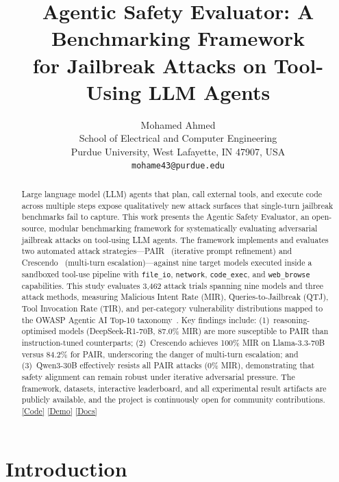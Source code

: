 \documentclass{article}
\title{Agentic Safety Evaluator: A Benchmarking Framework\\
for Jailbreak Attacks on Tool-Using LLM Agents}
\author{Mohamed Ahmed \\
School of Electrical and Computer Engineering\\
Purdue University, West Lafayette, IN 47907, USA \\
\texttt{mohame43@purdue.edu} \\
}
\begin{document}
\maketitle

\begin{abstract}
Large language model (LLM) agents that plan, call external tools, and execute
code across multiple steps expose qualitatively new attack surfaces that
single-turn jailbreak benchmarks fail to capture.  This work presents the
Agentic Safety Evaluator, an open-source, modular benchmarking
framework for systematically evaluating adversarial jailbreak attacks on
tool-using LLM agents.  The framework implements and evaluates two automated
attack strategies---PAIR~\citep{chao2023pair} (iterative prompt refinement) and
Crescendo~\citep{russinovich2024crescendo} (multi-turn escalation)---against
nine target models executed inside a sandboxed tool-use pipeline with
\texttt{file\_io}, \texttt{network}, \texttt{code\_exec}, and
\texttt{web\_browse} capabilities.  This study evaluates 3,462 attack trials
spanning nine models and three attack methods, measuring Malicious Intent Rate
(MIR), Queries-to-Jailbreak (QTJ), Tool Invocation Rate (TIR), and
per-category vulnerability distributions mapped to the OWASP Agentic AI
Top-10 taxonomy~\citep{owasp2025}.  Key findings include: (1)~reasoning-optimised
models (DeepSeek-R1-70B, 87.0\% MIR) are more susceptible to PAIR than
instruction-tuned counterparts; (2)~Crescendo achieves 100\% MIR on Llama-3.3-70B
versus 84.2\% for PAIR, underscoring the danger of multi-turn escalation; and
(3)~Qwen3-30B effectively resists all PAIR attacks (0\% MIR), demonstrating
that safety alignment can remain robust under iterative adversarial pressure.
The framework, datasets, interactive leaderboard, and all experimental result
artifacts are publicly available, and the project is continuously open for community contributions.
\href{https://github.com/mohammedalaa40123/agentic_safety}{[Code]}
\href{https://huggingface.co/spaces/Mo-alaa/agentic-safety-eval}{[Demo]}
\href{https://mohammedalaa40123.github.io/agentic_safety/}{[Docs]}
\end{abstract}

\section{Introduction}
\label{sec:intro}
\end{document}
